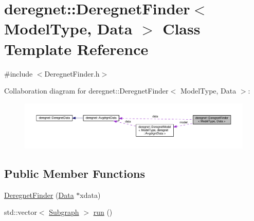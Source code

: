 \hypertarget{classderegnet_1_1DeregnetFinder}{}\section{deregnet\+:\+:Deregnet\+Finder$<$ Model\+Type, Data $>$ Class Template Reference}
\label{classderegnet_1_1DeregnetFinder}


{\ttfamily \#include $<$Deregnet\+Finder.\+h$>$}



Collaboration diagram for deregnet\+:\+:Deregnet\+Finder$<$ Model\+Type, Data $>$\+:\nopagebreak
\begin{figure}[H]
\begin{center}
\leavevmode
\includegraphics[width=350pt]{classderegnet_1_1DeregnetFinder__coll__graph}
\end{center}
\end{figure}
\subsection*{Public Member Functions}
\begin{DoxyCompactItemize}
\item 
\hyperlink{classderegnet_1_1DeregnetFinder_a5a19a86a0f9f9fa17e8ab625c748d31a}{Deregnet\+Finder} (\hyperlink{avgdrgnt_8cpp_a1d1235306db276e9b36acba1db1509e8}{Data} $\ast$xdata)
\item 
std\+::vector$<$ \hyperlink{structderegnet_1_1Subgraph}{Subgraph} $>$ \hyperlink{classderegnet_1_1DeregnetFinder_a1a6119b306b54ff44d8c78f34fc037ab}{run} ()
\end{DoxyCompactItemize}

